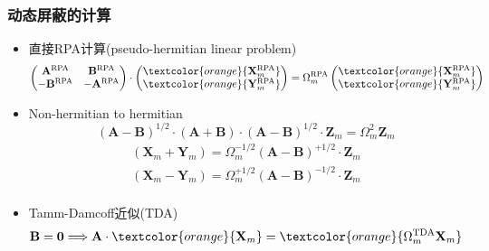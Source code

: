 \frame
{
	\frametitle{动态屏蔽的计算}
	\begin{itemize}
		\item 直接\textrm{RPA}计算\textrm{(pseudo-hermitian linear problem)}
			\begin{displaymath}
				\begin{aligned}
					\begin{pmatrix}
						\mathbf{A}^{\mathrm{RPA}} &\mathbf{B}^{\mathrm{RPA}}\\
						-\mathbf{B}^{\mathrm{RPA}} &-\mathbf{A}^{\mathrm{RPA}}\\
					\end{pmatrix}
					\cdot
					\begin{pmatrix}
						\textcolor{orange}{	\mathbf{X}_m^{\mathrm{RPA}}}\\
						\textcolor{orange}{\mathbf{Y}_m^{\mathrm{RPA}}}
					\end{pmatrix}=\Omega_{m}^{\mathrm{RPA}}
					\begin{pmatrix}
						\textcolor{orange}{	\mathbf{X}_m^{\mathrm{RPA}}}\\
						\textcolor{orange}{\mathbf{Y}_m^{\mathrm{RPA}}}
					\end{pmatrix}
				\end{aligned}
			\end{displaymath}
			{\fontsize{9.0pt}{6.2pt}}
		\item \textrm{Non-hermitian to hermitian}
			\begin{displaymath}
				(\mathbf{A}-\mathbf{B})^{1/2}\cdot(\mathbf{A}+\mathbf{B})\cdot(\mathbf{A}-\mathbf{B})^{1/2}\cdot\mathbf{Z}_m=\Omega_m^2\mathbf{Z}_m
			\end{displaymath}
			\begin{displaymath}
				\begin{aligned}
					(\mathbf{X}_m+\mathbf{Y}_m)=\Omega_m^{-1/2}(\mathbf{A}-\mathbf{B})^{+1/2}\cdot\mathbf{Z}_m\\
					(\mathbf{X}_m-\mathbf{Y}_m)=\Omega_m^{+1/2}(\mathbf{A}-\mathbf{B})^{-1/2}\cdot\mathbf{Z}_m\\
				\end{aligned}
			\end{displaymath}
		\item \textrm{Tamm-Damcoff}近似\textrm{(TDA)}
			\begin{displaymath}
				\mathbf{B}=\mathbf{0}\Longrightarrow \mathbf{A}\cdot\textcolor{orange}{\mathbf{X}_m}=\textcolor{orange}{\Omega_m^{\mathrm{TDA}}\mathbf{X}_m}
			\end{displaymath}
	\end{itemize}
}

